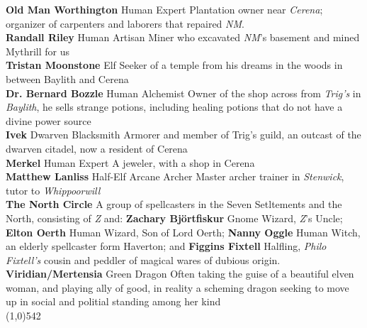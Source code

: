 \documentclass[letterpaper]{article}
\newcommand{\fullline}{\noindent\line(1,0){542} \\}
\newcommand{\person}[3]{\noindent\textbf{#1
    \ifstrequal{#2}{M}{{\color{ProcessBlue}\male}}{%
    \ifstrequal{#2}{F}{\color{VioletRed}\female}{}}}{\scriptsize #3}}
\begin{document}
\person{Old Man Worthington}{M}{Human Expert} Plantation owner near \emph{Cerena}; organizer of carpenters and laborers that repaired \emph{NM}.\\
\person{Randall Riley}{M}{Human Artisan} Miner who excavated \emph{NM}'s basement and mined Mythrill for us \\
\person{Tristan Moonstone}{M}{Elf} Seeker of a temple from his dreams in the woods in between Baylith and Cerena \\
\person{Dr. Bernard Bozzle}{M}{Human Alchemist} Owner of the shop across from \emph{Trig's} in \emph{Baylith}, he sells strange potions, including healing potions that do not have a divine power source\\
\person{Ivek}{M}{Dwarven Blacksmith} Armorer and member of Trig's guild, an outcast of the dwarven citadel, now a resident of Cerena \\
\person{Merkel}{F}{Human Expert} A jeweler, with a shop in Cerena \\
\person{Matthew Lanliss}{M}{Half-Elf Arcane Archer} Master archer trainer in \emph{Stenwick}, tutor to \emph{Whippoorwill} \\
\noindent\textbf{The North Circle} A group of spellcasters in the Seven Setltements and the North, consisting of \emph{Z} and: \person{Zachary Bj\"{o}rtfiskur}{M}{Gnome Wizard}, \emph{Z}'s Uncle; \person{Elton Oerth}{M}{Human Wizard}, Son of Lord Oerth; \person{Nanny Oggle}{F}{Human Witch}, an elderly spellcaster form Haverton; and \person{Figgins Fixtell}{M}{Halfling}, \emph{Philo Fixtell's} cousin and peddler of magical wares of dubious origin. \\
\person{Viridian/Mertensia}{F}{Green Dragon} Often taking the guise of a beautiful elven woman, and playing ally of good, in reality a scheming dragon seeking to move up in social and politial standing among her kind \\

\vspace{-1.75em}
\fullline
\vspace{-1.5em}
\end{document}
